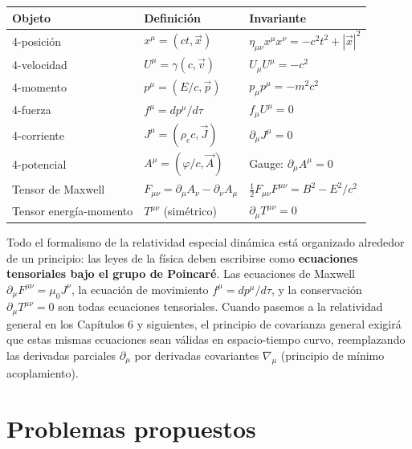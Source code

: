 \begin{center}
\renewcommand{\arraystretch}{1.6}
\begin{tabular}{lll}
\hline
\textbf{Objeto} & \textbf{Definición} & \textbf{Invariante} \\
\hline
4-posición & $x^\mu = (ct, \vec{x})$ & $\eta_{\mu\nu}x^\mu x^\nu = -c^2t^2+|\vec{x}|^2$ \\
4-velocidad & $U^\mu = \gamma(c, \vec{v})$ & $U_\mu U^\mu = -c^2$ \\
4-momento   & $p^\mu = (E/c, \vec{p})$ & $p_\mu p^\mu = -m^2c^2$ \\
4-fuerza    & $f^\mu = dp^\mu/d\tau$ & $f_\mu U^\mu = 0$ \\
4-corriente & $J^\mu = (\rho_e c, \vec{J})$ & $\partial_\mu J^\mu = 0$ \\
4-potencial & $A^\mu = (\varphi/c, \vec{A})$ & Gauge: $\partial_\mu A^\mu = 0$ \\
Tensor de Maxwell & $F_{\mu\nu} = \partial_\mu A_\nu - \partial_\nu A_\mu$ & $\frac{1}{2}F_{\mu\nu}F^{\mu\nu} = B^2 - E^2/c^2$ \\
Tensor energía-momento & $T^{\mu\nu}$ (simétrico) & $\partial_\mu T^{\mu\nu} = 0$ \\
\hline
\end{tabular}
\end{center}

\begin{importante}
Todo el formalismo de la relatividad especial dinámica está organizado alrededor de un principio: las leyes de la física deben escribirse como \textbf{ecuaciones tensoriales bajo el grupo de Poincaré}. Las ecuaciones de Maxwell $\partial_\mu F^{\mu\nu} = \mu_0 J^\nu$, la ecuación de movimiento $f^\mu = dp^\mu/d\tau$, y la conservación $\partial_\mu T^{\mu\nu} = 0$ son todas ecuaciones tensoriales. Cuando pasemos a la relatividad general en los Capítulos 6 y siguientes, el principio de covarianza general exigirá que estas mismas ecuaciones sean válidas en espacio-tiempo curvo, reemplazando las derivadas parciales $\partial_\mu$ por derivadas covariantes $\nabla_\mu$ (principio de mínimo acoplamiento).
\end{importante}

\section{Problemas propuestos}


